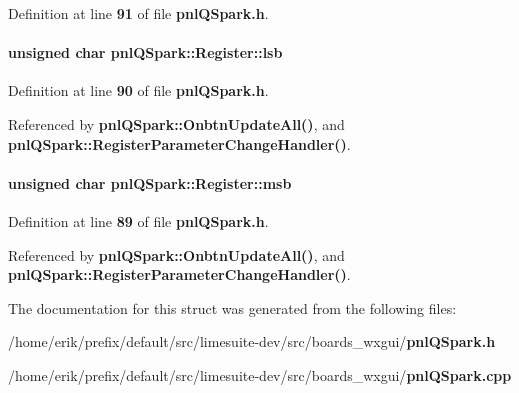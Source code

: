 Definition at line {\bf 91} of file {\bf pnl\+Q\+Spark.\+h}.

\paragraph[{lsb}]{\setlength{\rightskip}{0pt plus 5cm}unsigned char pnl\+Q\+Spark\+::\+Register\+::lsb}\label{structpnlQSpark_1_1Register_a22437c3bee66d8a46c5cc1fb2dd8b35c}


Definition at line {\bf 90} of file {\bf pnl\+Q\+Spark.\+h}.



Referenced by {\bf pnl\+Q\+Spark\+::\+Onbtn\+Update\+All()}, and {\bf pnl\+Q\+Spark\+::\+Register\+Parameter\+Change\+Handler()}.

\paragraph[{msb}]{\setlength{\rightskip}{0pt plus 5cm}unsigned char pnl\+Q\+Spark\+::\+Register\+::msb}\label{structpnlQSpark_1_1Register_a6d6ca5f5bf0f2415f455973f2b1c2103}


Definition at line {\bf 89} of file {\bf pnl\+Q\+Spark.\+h}.



Referenced by {\bf pnl\+Q\+Spark\+::\+Onbtn\+Update\+All()}, and {\bf pnl\+Q\+Spark\+::\+Register\+Parameter\+Change\+Handler()}.



The documentation for this struct was generated from the following files\+:\begin{DoxyCompactItemize}
\item 
/home/erik/prefix/default/src/limesuite-\/dev/src/boards\+\_\+wxgui/{\bf pnl\+Q\+Spark.\+h}\item 
/home/erik/prefix/default/src/limesuite-\/dev/src/boards\+\_\+wxgui/{\bf pnl\+Q\+Spark.\+cpp}\end{DoxyCompactItemize}

